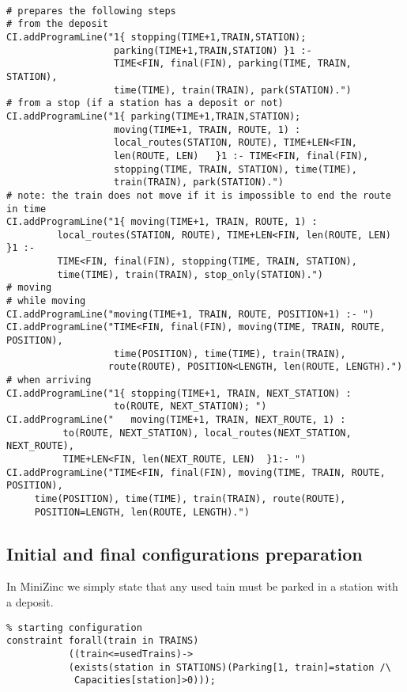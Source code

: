 \documentclass[11pt]{article}
\begin{document}
\begin{verbatim}

# prepares the following steps
# from the deposit
CI.addProgramLine("1{ stopping(TIME+1,TRAIN,STATION);
                   parking(TIME+1,TRAIN,STATION) }1 :-
                   TIME<FIN, final(FIN), parking(TIME, TRAIN, STATION),
                   time(TIME), train(TRAIN), park(STATION).")
# from a stop (if a station has a deposit or not)
CI.addProgramLine("1{ parking(TIME+1,TRAIN,STATION);
                   moving(TIME+1, TRAIN, ROUTE, 1) :
                   local_routes(STATION, ROUTE), TIME+LEN<FIN,
                   len(ROUTE, LEN)   }1 :- TIME<FIN, final(FIN),
                   stopping(TIME, TRAIN, STATION), time(TIME),
                   train(TRAIN), park(STATION).")
# note: the train does not move if it is impossible to end the route in time
CI.addProgramLine("1{ moving(TIME+1, TRAIN, ROUTE, 1) :
         local_routes(STATION, ROUTE), TIME+LEN<FIN, len(ROUTE, LEN) }1 :- 
         TIME<FIN, final(FIN), stopping(TIME, TRAIN, STATION),
         time(TIME), train(TRAIN), stop_only(STATION).")
# moving
# while moving
CI.addProgramLine("moving(TIME+1, TRAIN, ROUTE, POSITION+1) :- ")
CI.addProgramLine("TIME<FIN, final(FIN), moving(TIME, TRAIN, ROUTE, POSITION),
                   time(POSITION), time(TIME), train(TRAIN),
                  route(ROUTE), POSITION<LENGTH, len(ROUTE, LENGTH).")
# when arriving
CI.addProgramLine("1{ stopping(TIME+1, TRAIN, NEXT_STATION) :
                   to(ROUTE, NEXT_STATION); ")
CI.addProgramLine("   moving(TIME+1, TRAIN, NEXT_ROUTE, 1) : 
          to(ROUTE, NEXT_STATION), local_routes(NEXT_STATION, NEXT_ROUTE),
          TIME+LEN<FIN, len(NEXT_ROUTE, LEN)  }1:- ")
CI.addProgramLine("TIME<FIN, final(FIN), moving(TIME, TRAIN, ROUTE, POSITION),
     time(POSITION), time(TIME), train(TRAIN), route(ROUTE),
     POSITION=LENGTH, len(ROUTE, LENGTH).") 
\end{verbatim}

\subsection{Initial and final configurations preparation}

In MiniZinc we simply state that any used tain must be parked in a station
with a deposit.

\begin{verbatim}
% starting configuration    
constraint forall(train in TRAINS)
           ((train<=usedTrains)->
           (exists(station in STATIONS)(Parking[1, train]=station /\
            Capacities[station]>0))); 
\end{verbatim}
\end{document}
